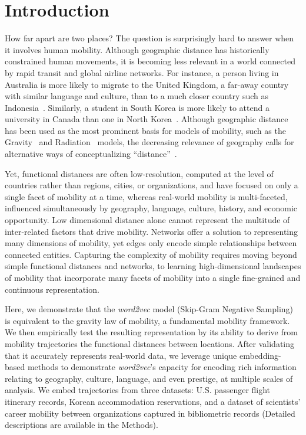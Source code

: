 \documentclass[12pt]{article} %
\begin{document}
%
%
\section*{Introduction}\label{sec:introduction} %


How far apart are two places?
The question is surprisingly hard to answer when it involves human mobility.
Although geographic distance has historically constrained human movements, it is becoming less relevant in a world connected by rapid transit and global airline networks.
For instance, a person living in Australia is more likely to migrate to the United Kingdom, a far-away country with similar language and culture, than to a much closer country such as Indonesia~\autocite{pew2018migration}.
Similarly, a student in South Korea is more likely to attend a university in Canada than one in North Korea~\autocite{unesco2019students}.
Although geographic distance has been used as the most prominent basis for models of mobility, such as the Gravity~\autocite{zipf1946gravity} and Radiation~\autocite{simini2012universal} models, the decreasing relevance of geography calls for alternative ways of conceptualizing ``distance''~\autocite{boschma2005proximity, brown1970migration, kim2018functional}.

Yet, functional distances are often low-resolution, computed at the level of countries rather than regions, cities, or organizations, and have focused on only a single facet of mobility at a time, whereas real-world mobility is multi-faceted, influenced simultaneously by geography, language, culture, history, and economic opportunity.
Low dimensional distance alone cannot represent the multitude of inter-related factors that drive mobility.
Networks offer a solution to representing many dimensions of mobility, yet edges only encode simple relationships between connected entities.
Capturing the complexity of mobility requires moving beyond simple functional distances and networks, to learning high-dimensional landscapes of mobility that incorporate many facets of mobility into a single fine-grained and continuous representation.

Here, we demonstrate that the \textit{word2vec} model (Skip-Gram Negative Sampling) is equivalent to the gravity law of mobility, a fundamental mobility framework.
We then empirically test the resulting representation by its ability to derive from mobility trajectories the functional distances between locations.
After validating that it accurately represents real-world data, we leverage unique embedding-based methods to demonstrate \textit{word2vec}'s capacity for encoding rich information relating to geography, culture, language, and even prestige, at multiple scales of analysis.
We embed trajectories from three datasets: U.S. passenger flight itinerary records, Korean accommodation reservations, and a dataset of scientists' career mobility between organizations captured in bibliometric records (Detailed descriptions are available in the Methods).
\end{document}
